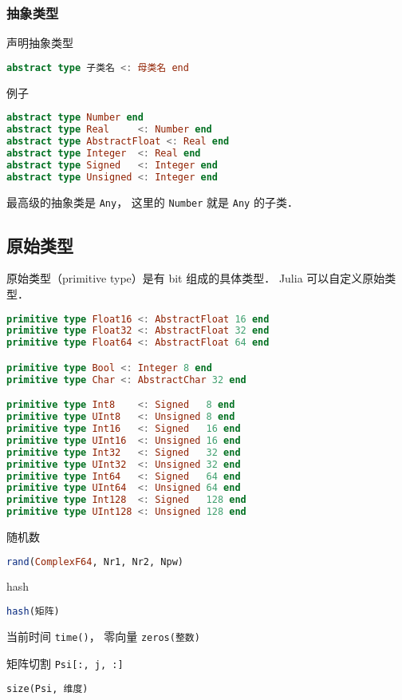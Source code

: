 \subsubsection{抽象类型}
声明抽象类型
\begin{lstlisting}[language=julia]
abstract type 子类名 <: 母类名 end
\end{lstlisting}
例子
\begin{lstlisting}[language=julia]
abstract type Number end
abstract type Real     <: Number end
abstract type AbstractFloat <: Real end
abstract type Integer  <: Real end
abstract type Signed   <: Integer end
abstract type Unsigned <: Integer end
\end{lstlisting}
最高级的抽象类是 \verb|Any|， 这里的 \verb|Number| 就是 \verb|Any| 的子类．

\subsection{原始类型}
原始类型（primitive type）是有 bit 组成的具体类型． Julia 可以自定义原始类型．
\begin{lstlisting}[language=julia]
primitive type Float16 <: AbstractFloat 16 end
primitive type Float32 <: AbstractFloat 32 end
primitive type Float64 <: AbstractFloat 64 end

primitive type Bool <: Integer 8 end
primitive type Char <: AbstractChar 32 end

primitive type Int8    <: Signed   8 end
primitive type UInt8   <: Unsigned 8 end
primitive type Int16   <: Signed   16 end
primitive type UInt16  <: Unsigned 16 end
primitive type Int32   <: Signed   32 end
primitive type UInt32  <: Unsigned 32 end
primitive type Int64   <: Signed   64 end
primitive type UInt64  <: Unsigned 64 end
primitive type Int128  <: Signed   128 end
primitive type UInt128 <: Unsigned 128 end
\end{lstlisting}


随机数
\begin{lstlisting}[language=julia]
rand(ComplexF64, Nr1, Nr2, Npw)
\end{lstlisting}

hash
\begin{lstlisting}[language=julia]
hash(矩阵)
\end{lstlisting}

当前时间 \verb|time()|， 零向量 \verb|zeros(整数)|

矩阵切割 \verb|Psi[:, j, :]|

\verb|size(Psi, 维度)|

